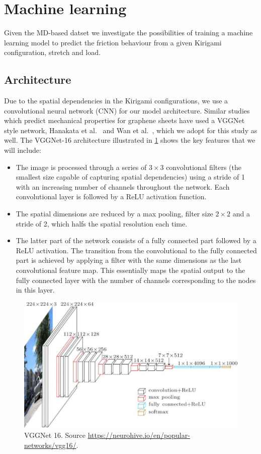 \section{Machine learning}

Given the \acrshort{MD}-based datset we investigate the possibilities of training a machine learning model to predict the friction behaviour from a given Kirigami configuration, stretch and load. 




\subsection{Architecture}
Due to the spatial dependencies in the Kirigami configurations, we use a convolutional neural network (\acrshort{CNN}) for our model architecture. Similar studies which predict mechanical properties for graphene sheets have used a VGGNet style network, Hanakata et al.\ \cite{PhysRevLett.121.255304, PhysRevResearch.2.042006} and Wan et al.\ \cite{graphene/hBN}, which we adopt for this study as well. The VGGNet-16 architecture illustrated in \cref{fig:VGGNet16} shows the key features that we will include:
\begin{itemize}
  \item The image is processed through a series of $3 \times 3$ convolutional filters (the smallest size capable of capturing spatial dependencies) using a stride of 1 with an increasing number of channels throughout the network. Each convolutional layer is followed by a ReLU activation function. 
  \item The spatial dimensions are reduced by a max pooling, filter size $2 \times 2$ and a stride of 2, which halfs the spatial resolution each time. 
  \item The latter part of the network consists of a fully connected part followed by a ReLU activation. The transition from the convolutional to the fully connected part is achieved by applying a filter with the same dimensions as the last convolutional feature map. This essentially maps the spatial output to the fully connected layer with the number of channels corresponding to the nodes in this layer.
\end{itemize}

\begin{figure}[H]
  \centering
  \includegraphics[width=0.7\linewidth]{figures/ML/VGGNet16.jpg}
  \caption{VGGNet 16. Source \url{https://neurohive.io/en/popular-networks/vgg16/}.}
  \label{fig:VGGNet16}
\end{figure}

